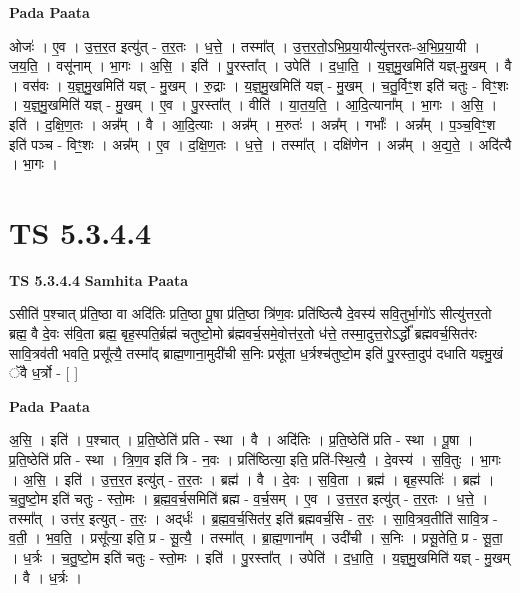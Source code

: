 \documentclass[17pt]{extarticle}
\begin{document}
\textbf{Pada Paata} \newline

ओजः॑ । ए॒व । उ॒त्त॒र॒त इत्यु॑त् - त॒र॒तः । ध॒त्ते॒ । तस्मा᳚त् । उ॒त्त॒र॒तो॒ऽभि॒प्र॒या॒यीत्यु॑त्तरतः-अ॒भि॒प्र॒या॒यी । ज॒य॒ति॒ । वसू॑नाम् । भा॒गः । अ॒सि॒ । इति॑ । पु॒रस्ता᳚त् । उपेति॑ । द॒धा॒ति॒ । य॒ज्ञ्॒मु॒खमिति॑ यज्ञ्-मु॒खम् । वै । वस॑वः । य॒ज्ञ्॒मु॒खमिति॑ यज्ञ् - मु॒खम् । रु॒द्राः । य॒ज्ञ्॒मु॒खमिति॑ यज्ञ् - मु॒खम् । च॒तु॒र्विꣳ॒॒श इति॑ चतुः - विꣳ॒॒शः । य॒ज्ञ्॒मु॒खमिति॑ यज्ञ् - मु॒खम् । ए॒व । पु॒रस्ता᳚त् । वीति॑ । या॒त॒य॒ति॒ । आ॒दि॒त्याना᳚म् । भा॒गः । अ॒सि॒ । इति॑ । द॒क्षि॒ण॒तः । अन्न᳚म् । वै । आ॒दि॒त्याः । अन्न᳚म् । म॒रुतः॑ । अन्न᳚म् । गर्भाः᳚ । अन्न᳚म् । प॒ञ्च॒विꣳ॒॒श इति॑ पञ्च - विꣳ॒॒शः । अन्न᳚म् । ए॒व । द॒क्षि॒ण॒तः । ध॒त्ते॒ । तस्मा᳚त् । दक्षि॑णेन । अन्न᳚म् । अ॒द्य॒ते॒ । अदि॑त्यै । भा॒गः ।  \newline





\section{ TS 5.3.4.4 }

\textbf{TS 5.3.4.4 } \newline
\textbf{Samhita Paata} \newline

ऽसीति॑ प॒श्चात् प्र॑ति॒ष्ठा वा अदि॑तिः प्रति॒ष्ठा पू॒षा प्र॑ति॒ष्ठा त्रि॑ण॒वः प्रति॑ष्ठित्यै दे॒वस्य॑ सवि॒तुर्भा॒गो॑ऽ सीत्यु॑त्तर॒तो ब्रह्म॒ वै दे॒वः स॑वि॒ता ब्रह्म॒ बृह॒स्पति॒र्ब्रह्म॑ चतुष्टो॒मो ब्र॑ह्मवर्च॒समे॒वोत्त॑र॒तो ध॑त्ते॒ तस्मा॒दुत्त॒रोऽर्द्धो᳚ ब्रह्मवर्च॒सित॑रः सावि॒त्रव॑ती भवति॒ प्रसू᳚त्यै॒ तस्मा᳚द् ब्राह्म॒णाना॒मुदी॑ची स॒निः प्रसू॑ता ध॒र्त्रश्च॑तुष्टो॒म इति॑ पु॒रस्ता॒दुप॑ दधाति यज्ञ्मु॒खं ॅवै ध॒र्त्रो - [  ] \newline

\textbf{Pada Paata} \newline

अ॒सि॒ । इति॑ । प॒श्चात् । प्र॒ति॒ष्ठेति॑ प्रति - स्था । वै । अदि॑तिः । प्र॒ति॒ष्ठेति॑ प्रति - स्था । पू॒षा । प्र॒ति॒ष्ठेति॑ प्रति - स्था । त्रि॒ण॒व इति॑ त्रि - न॒वः । प्रति॑ष्ठित्या॒ इति॒ प्रति॑-स्थि॒त्यै॒ । दे॒वस्य॑ । स॒वि॒तुः । भा॒गः । अ॒सि॒ । इति॑ । उ॒त्त॒र॒त इत्यु॑त् - त॒र॒तः । ब्रह्म॑ । वै । दे॒वः । स॒वि॒ता । ब्रह्म॑ । बृह॒स्पतिः॑ । ब्रह्म॑ । च॒तु॒ष्टो॒म इति॑ चतुः - स्तो॒मः । ब्र॒ह्म॒व॒र्च॒समिति॑ ब्रह्म - व॒र्च॒सम् । ए॒व । उ॒त्त॒र॒त इत्यु॑त् - त॒र॒तः । ध॒त्ते॒ । तस्मा᳚त् । उत्त॑र॒ इत्युत् - त॒रः॒ । अद्‌र्धः॑ । ब्र॒ह्म॒व॒र्च॒सित॑र॒ इति॑ ब्रह्मवर्च॒सि - त॒रः॒ । सा॒वि॒त्रव॒तीति॑ सावि॒त्र - व॒ती॒ । भ॒व॒ति॒ । प्रसू᳚त्या॒ इति॒ प्र - सू॒त्यै॒ । तस्मा᳚त् । ब्रा॒ह्म॒णाना᳚म् । उदी॑ची । स॒निः । प्रसू॒तेति॒ प्र - सू॒ता॒ । ध॒र्त्रः । च॒तु॒ष्टो॒म इति॑ चतुः - स्तो॒मः । इति॑ । पु॒रस्ता᳚त् । उपेति॑ । द॒धा॒ति॒ । य॒ज्ञ्॒मु॒खमिति॑ यज्ञ् - मु॒खम् । वै । ध॒र्त्रः ।  \newline
\end{document}
